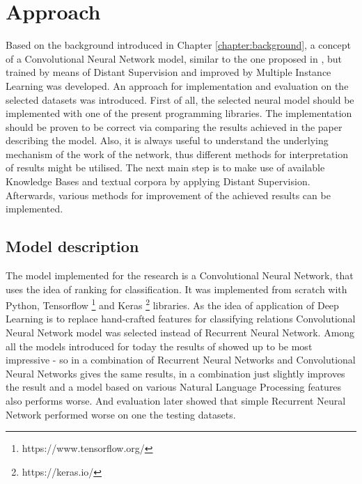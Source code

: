 \chapter{Approach} 
\label{chapter:approach}

Based on the background introduced in Chapter \ref{chapter:background}, a concept of 
a Convolutional Neural Network model, similar to the one proposed in \cite{DBLP:journals/corr/SantosXZ15}, 
but trained by means of Distant Supervision and improved by Multiple Instance Learning was developed.
An approach for implementation and evaluation on the selected datasets was introduced. 
First of all, the selected neural model 
should be implemented with one of the present programming libraries. The implementation 
should be proven to be correct via comparing the results achieved in the paper describing 
the model. Also, it is always useful to understand the underlying mechanism of the work of the 
network, thus different methods for interpretation of results might be utilised. The next main step is 
to make use of available Knowledge Bases and textual corpora by applying Distant Supervision. 
Afterwards, various methods for improvement of the achieved results can be implemented.
	
\section{Model description}
The model implemented for the research is a Convolutional Neural Network, that uses the idea 
of ranking for classification. It was implemented from scratch with 
Python, Tensorflow \footnote{https://www.tensorflow.org/} and Keras \footnote{https://keras.io/} 
libraries. As the idea of application of Deep Learning is to replace hand-crafted features for 
classifying relations Convolutional Neural Network model was selected instead of Recurrent Neural Network. 
Among all the models introduced for today the results of \cite{DBLP:journals/corr/SantosXZ15} 
showed up to be most impressive - so in \cite{nguyen2015combining} a combination of Recurrent 
Neural Networks and Convolutional Neural Networks gives the same results, in \cite{vu2016combining} 
a combination just slightly improves the result and a model based on various Natural Language Processing features 
\cite{gormley2015improved} also 
performs worse. And evaluation later showed that simple Recurrent Neural Network performed 
worse on one the testing datasets.

